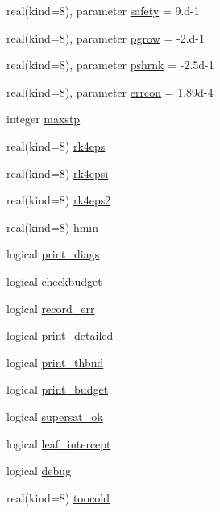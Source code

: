 \begin{DoxyCompactItemize}
\item 
real(kind=8), parameter \hyperlink{namespacerk4__coms_ab0aa0551adf0417c09a0a0e4f4bcb934}{safety} = 9.d-\/1
\item 
real(kind=8), parameter \hyperlink{namespacerk4__coms_a796865569153ec93dae2cc10d6dd7909}{pgrow} = -\/2.d-\/1
\item 
real(kind=8), parameter \hyperlink{namespacerk4__coms_a83a7b5210aa05ed67147b0b6e4250f46}{pshrnk} = -\/2.\+5d-\/1
\item 
real(kind=8), parameter \hyperlink{namespacerk4__coms_a5b9d4d10eb75a3f0b44f3876ade2c3eb}{errcon} = 1.\+89d-\/4
\item 
integer \hyperlink{namespacerk4__coms_a9fc78b38e070c62f9669f9db9d966784}{maxstp}
\item 
real(kind=8) \hyperlink{namespacerk4__coms_aa154e17784b65f05a89af9b4f86bb879}{rk4eps}
\item 
real(kind=8) \hyperlink{namespacerk4__coms_a2d6ae9880c44662592dc0e0d238c3229}{rk4epsi}
\item 
real(kind=8) \hyperlink{namespacerk4__coms_a2b1484b3befa3c0d446279fa4001a56d}{rk4eps2}
\item 
real(kind=8) \hyperlink{namespacerk4__coms_a5bf08e5e23fca150f09adc446272b7fb}{hmin}
\item 
logical \hyperlink{namespacerk4__coms_a45d06376c0007b5db575b229cc2d11b1}{print\+\_\+diags}
\item 
logical \hyperlink{namespacerk4__coms_a9b8354d59e352fedb78f49d2195a9d7a}{checkbudget}
\item 
logical \hyperlink{namespacerk4__coms_a8758ba5171a32f83e20dd93601fa21d6}{record\+\_\+err}
\item 
logical \hyperlink{namespacerk4__coms_a9b7ff048a348436a9163405f31d72e29}{print\+\_\+detailed}
\item 
logical \hyperlink{namespacerk4__coms_ad87029f758f9a6906b3aea2205873427}{print\+\_\+thbnd}
\item 
logical \hyperlink{namespacerk4__coms_a062e3f5a857cb1364f87fda6223f2259}{print\+\_\+budget}
\item 
logical \hyperlink{namespacerk4__coms_a304419c7dc18d710be779d2d1a1378e7}{supersat\+\_\+ok}
\item 
logical \hyperlink{namespacerk4__coms_ab6eb51e1fa8b861cc6fb6359631bdec3}{leaf\+\_\+intercept}
\item 
logical \hyperlink{namespacerk4__coms_a5abb49d2a6e86524f3c3bf3f67468c21}{debug}
\item 
real(kind=8) \hyperlink{namespacerk4__coms_ac687fa7b7b3d3a5b1d3bd179e62c8052}{toocold}

\end{DoxyCompactItemize}
